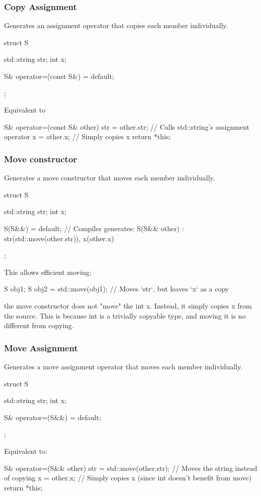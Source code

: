 \documentclass{report}
\begin{document}
    \bigbreak \noindent 
    \subsubsection{Copy Assignment}
    \bigbreak \noindent 
    Generates an assignment operator that copies each member individually.
    \bigbreak \noindent 
    \begin{cppcode}
        struct S {
            std::string str;
            int x;

            S& operator=(const S&) = default;
        };
    \end{cppcode}
    \bigbreak \noindent 
    Equivalent to
    \bigbreak \noindent 
    \begin{cppcode}
        S& operator=(const S& other) {
            str = other.str; // Calls std::string's assignment operator
            x = other.x;     // Simply copies x
            return *this;
        }
    \end{cppcode}

    \bigbreak \noindent 
    \subsubsection{Move constructor}
    \bigbreak \noindent 
    Generates a move constructor that moves each member individually.
    \bigbreak \noindent 
    \begin{cppcode}
        struct S {
            std::string str;
            int x;

            S(S&&) = default;  // Compiler generates: S(S&& other) : str(std::move(other.str)), x(other.x) {}
        };
    \end{cppcode}
    \bigbreak \noindent 
    This allows efficient moving:
    \bigbreak \noindent 
    \begin{cppcode}
        S obj1;
        S obj2 = std::move(obj1);  // Moves `str`, but leaves `x` as a copy
    \end{cppcode}
    \bigbreak \noindent 
    the move constructor does not "move" the int x. Instead, it simply copies x from the source. This is because int is a trivially copyable type, and moving it is no different from copying.

    \bigbreak \noindent 
    \subsubsection{ Move Assignment}
    \bigbreak \noindent 
    Generates a move assignment operator that moves each member individually.
    \bigbreak \noindent 
    \begin{cppcode}
        struct S {
            std::string str;
            int x;

            S& operator=(S&&) = default;
        };
    \end{cppcode}
    \bigbreak \noindent 
    Equivalent to:
    \bigbreak \noindent 
    \begin{cppcode}
        S& operator=(S&& other) {
            str = std::move(other.str);  // Moves the string instead of copying
            x = other.x;  // Simply copies x (since int doesn't benefit from move)
            return *this;
        }
    \end{cppcode}
    \bigbreak \noindent 
\end{document}
